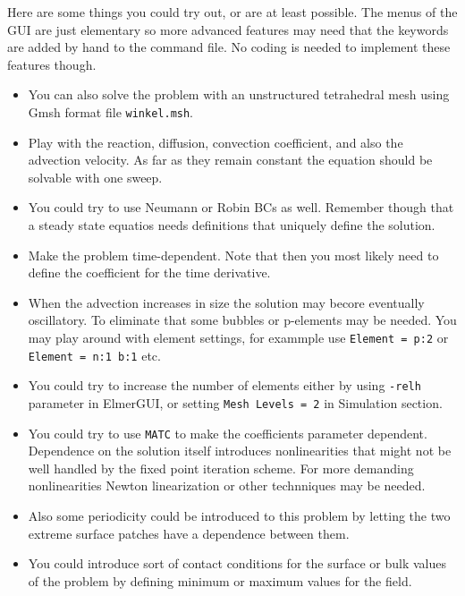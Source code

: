 Here are some things you could try out, or are at least possible. The menus of the GUI are just 
elementary so more advanced features may need that the keywords are added by hand to the 
command file. No coding is needed to implement these features though. 
\begin{itemize}
\item You can also solve the problem with an unstructured tetrahedral mesh using Gmsh format file \texttt{winkel.msh}. 
\item Play with the reaction, diffusion, convection coefficient, and also the advection velocity.
As far as they remain constant the equation should be solvable with one sweep.
\item You could try to use Neumann or Robin BCs as well. Remember though that
a steady state equatios needs definitions that uniquely define the solution.
\item Make the problem time-dependent. Note that then you most likely need to define the 
coefficient for the time derivative. 
\item When the advection increases in size the solution may becore eventually oscillatory.
To eliminate that some bubbles or p-elements may be needed. You may play around with 
element settings, for exammple use \texttt{Element = p:2} or \texttt{Element = n:1 b:1} etc. 
\item You could try to increase the number of elements either by using \texttt{-relh} 
parameter in ElmerGUI, or setting \texttt{Mesh Levels = 2} in Simulation section.
\item You could try to use \texttt{MATC} to make the coefficients parameter dependent.
Dependence on the solution itself introduces nonlinearities that might not be well handled 
by the fixed point iteration scheme. For more demanding nonlinearities Newton linearization or
other technniques may be needed. 
\item Also some periodicity could be introduced to this problem by letting the 
two extreme surface patches have a dependence between them.
\item You could introduce sort of contact conditions for the surface or bulk values 
of the problem by defining minimum or maximum values for the field. 
\end{itemize}


\hfill
\mbox{}






